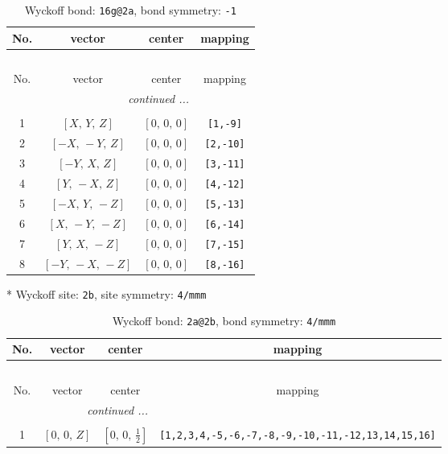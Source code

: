 \documentclass[fleqn,8pt]{jsarticle}
\begin{document}
\renewcommand{\arraystretch}{1.2}
\begin{longtable}{cccc}
\caption{Wyckoff bond: {\tt 16g@2a}, bond symmetry: {\tt -1}}
 \\
 \hline \hline
No. & vector & center & mapping \\ \hline \endfirsthead

\multicolumn{3}{l}{\tablename\ \thetable{}} \\
 \hline \hline
No. & vector & center & mapping \\ \hline \endhead

 \hline \hline
\multicolumn{3}{r}{\footnotesize\it continued ...} \\ \endfoot

 \hline \hline
\multicolumn{3}{r}{} \\ \endlastfoot

1 & $\left[ X,\, Y,\, Z \right]$ & $\left[ 0,\, 0,\, 0 \right]$ & {\tt [1,-9]} \\ \hline
2 & $\left[ - X,\, - Y,\, Z \right]$ & $\left[ 0,\, 0,\, 0 \right]$ & {\tt [2,-10]} \\ \hline
3 & $\left[ - Y,\, X,\, Z \right]$ & $\left[ 0,\, 0,\, 0 \right]$ & {\tt [3,-11]} \\ \hline
4 & $\left[ Y,\, - X,\, Z \right]$ & $\left[ 0,\, 0,\, 0 \right]$ & {\tt [4,-12]} \\ \hline
5 & $\left[ - X,\, Y,\, - Z \right]$ & $\left[ 0,\, 0,\, 0 \right]$ & {\tt [5,-13]} \\ \hline
6 & $\left[ X,\, - Y,\, - Z \right]$ & $\left[ 0,\, 0,\, 0 \right]$ & {\tt [6,-14]} \\ \hline
7 & $\left[ Y,\, X,\, - Z \right]$ & $\left[ 0,\, 0,\, 0 \right]$ & {\tt [7,-15]} \\ \hline
8 & $\left[ - Y,\, - X,\, - Z \right]$ & $\left[ 0,\, 0,\, 0 \right]$ & {\tt [8,-16]} \\
\end{longtable}
* Wyckoff site: {\tt 2b}, site symmetry: {\tt 4/mmm}
\renewcommand{\arraystretch}{1.2}
\begin{longtable}{cccc}
\caption{Wyckoff bond: {\tt 2a@2b}, bond symmetry: {\tt 4/mmm}}
 \\
 \hline \hline
No. & vector & center & mapping \\ \hline \endfirsthead

\multicolumn{3}{l}{\tablename\ \thetable{}} \\
 \hline \hline
No. & vector & center & mapping \\ \hline \endhead

 \hline \hline
\multicolumn{3}{r}{\footnotesize\it continued ...} \\ \endfoot

 \hline \hline
\multicolumn{3}{r}{} \\ \endlastfoot

1 & $\left[ 0,\, 0,\, Z \right]$ & $\left[ 0,\, 0,\, \frac{1}{2} \right]$ & {\tt [1,2,3,4,-5,-6,-7,-8,-9,-10,-11,-12,13,14,15,16]} \\
\end{longtable}
\end{document}
